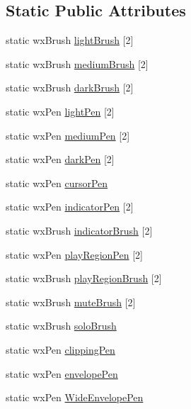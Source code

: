 \subsection*{Static Public Attributes}
\begin{DoxyCompactItemize}
\item 
static wx\+Brush \hyperlink{class_a_color_a43d85059fec73824a5af8108986fa021}{light\+Brush} \mbox{[}2\mbox{]}
\item 
static wx\+Brush \hyperlink{class_a_color_a022a54281f5c6e278a49d6e23923be9c}{medium\+Brush} \mbox{[}2\mbox{]}
\item 
static wx\+Brush \hyperlink{class_a_color_a090d8f51f09b81eee4b3a2e290591d1b}{dark\+Brush} \mbox{[}2\mbox{]}
\item 
static wx\+Pen \hyperlink{class_a_color_a611a29d7cd9e7ccec3fb8d7a7969e918}{light\+Pen} \mbox{[}2\mbox{]}
\item 
static wx\+Pen \hyperlink{class_a_color_a617898331e16a7c6151cbff1d75d7b84}{medium\+Pen} \mbox{[}2\mbox{]}
\item 
static wx\+Pen \hyperlink{class_a_color_aacd9bb4146b0a7571c2dbe202cf79a45}{dark\+Pen} \mbox{[}2\mbox{]}
\item 
static wx\+Pen \hyperlink{class_a_color_a53e154a8a01edf9f8fe3c25811bdbef2}{cursor\+Pen}
\item 
static wx\+Pen \hyperlink{class_a_color_ac17b92375412469dccbcfae2fb0e5d43}{indicator\+Pen} \mbox{[}2\mbox{]}
\item 
static wx\+Brush \hyperlink{class_a_color_a9e0d1b98d6c3265704e745e89246b73f}{indicator\+Brush} \mbox{[}2\mbox{]}
\item 
static wx\+Pen \hyperlink{class_a_color_ae02f79b262b2def91f1b205865b87f16}{play\+Region\+Pen} \mbox{[}2\mbox{]}
\item 
static wx\+Brush \hyperlink{class_a_color_a2ee41c1ba7f52d7a66774c8409b2ff2b}{play\+Region\+Brush} \mbox{[}2\mbox{]}
\item 
static wx\+Brush \hyperlink{class_a_color_a537f6a4be264c3fbf454d701cad9d247}{mute\+Brush} \mbox{[}2\mbox{]}
\item 
static wx\+Brush \hyperlink{class_a_color_aa9c19b58ca913c1de6095726f948c2da}{solo\+Brush}
\item 
static wx\+Pen \hyperlink{class_a_color_a286c0938ff13836b20bbd8715bcbeacd}{clipping\+Pen}
\item 
static wx\+Pen \hyperlink{class_a_color_a9706bc519ec6f6b7f93ddc6371331f07}{envelope\+Pen}
\item 
static wx\+Pen \hyperlink{class_a_color_a287fd4e5f875c7c18b83d358baaa9784}{Wide\+Envelope\+Pen}

\end{DoxyCompactItemize}
